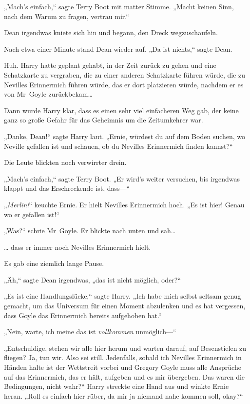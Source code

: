 {„Mach's einfach,“ sagte Terry Boot mit matter Stimme. „Macht keinen Sinn, nach dem Warum zu fragen, vertrau mir.“

Dean irgendwas kniete sich hin und begann, den Dreck wegzuschaufeln.

Nach etwa einer Minute stand Dean wieder auf. „Da ist nichts,“ sagte Dean.

Huh. Harry hatte geplant gehabt, in der Zeit zurück zu gehen und eine Schatzkarte zu vergraben, die zu einer anderen Schatzkarte führen würde, die zu Nevilles Erinnermich führen würde, das er dort platzieren würde, nachdem er es von Mr~Goyle zurückbekam…

Dann wurde Harry klar, dass es einen sehr viel einfacheren Weg gab, der keine ganz so große Gefahr für das Geheimnis um die Zeitumkehrer war.

„Danke, Dean!“ sagte Harry laut. „Ernie, würdest du auf dem Boden suchen, wo Neville gefallen ist und schauen, ob du Nevilles Erinnermich finden kannst?“

Die Leute blickten noch verwirrter drein.

„Mach's einfach,“ sagte Terry Boot. „Er wird's weiter versuchen, bis irgendwas klappt und das Erschreckende ist, dass—“

„\emph{Merlin!}“ keuchte Ernie. Er hielt Nevilles Erinnermich hoch. „Es ist hier! Genau wo er gefallen ist!“

„Was?“ schrie Mr~Goyle. Er blickte nach unten und sah…

… dass er immer noch Nevilles Erinnermich hielt.

Es gab eine ziemlich lange Pause.

„Äh,“ sagte Dean irgendwas, „das ist nicht möglich, oder?“

„Es ist eine Handlungslücke,“ sagte Harry. „Ich habe mich selbst seltsam genug gemacht, um das Universum für einen Moment abzulenken und es hat vergessen, dass Goyle das Erinnermich bereits aufgehoben hat.“

„Nein, warte, ich meine das ist \emph{vollkommen} unmöglich—“

„Entschuldige, stehen wir alle hier herum und warten darauf, auf Besenstielen zu fliegen? Ja, tun wir. Also sei still. Jedenfalls, sobald ich Nevilles Erinnermich in Händen halte ist der Wettstreit vorbei und Gregory Goyle muss alle Ansprüche auf das Erinnermich, das er hält, aufgeben und es mir übergeben. Das waren die Bedingungen, nicht wahr?“ Harry streckte eine Hand aus und winkte Ernie heran. „Roll es einfach hier rüber, da mir ja niemand nahe kommen soll, okay?“

}
